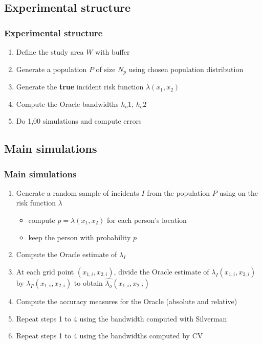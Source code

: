 \documentclass[notheorems]{beamer}
\theoremstyle{definition}
\theoremstyle{example}
\begin{document}
\subsection{Experimental structure}
\begin{frame}\frametitle{Experimental structure}
    \begin{enumerate}
        \item Define the study area $W$ with buffer
        \item Generate a population $P$ of size $N_p$ using chosen population distribution
        \item Generate the \textbf{true} incident risk function $\lambda(x_1, x_2)$
        \item Compute the Oracle bandwidths $h_o1$, $h_o2$
        \item Do 1,00 simulations and compute errors
    \end{enumerate}
\end{frame}

\subsection{Main simulations}
\begin{frame}\frametitle{Main simulations}
    \begin{enumerate}
        \item Generate a random sample of incidents $I$ from the population $P$ using on the risk function $\lambda$
            \begin{itemize}
                \item compute $p = \lambda(x_1,x_2)$ for each person's location
                \item keep the person with probability $p$
            \end{itemize}
        \item Compute the Oracle estimate of $\lambda_I$
        \item At each grid point $(x_{1,i}, x_{2,i})$,
                divide the Oracle estimate of $\lambda_I(x_{1,i}, x_{2,i})$
                by $\lambda_P(x_{1,i}, x_{2,i})$ to obtain $\hat{\lambda_o}(x_{1,i}, x_{2,i})$
        \item Compute the accuracy measures for the Oracle (absolute and relative)
        \item Repeat steps 1 to 4 using the bandwidth computed with Silverman
        \item Repeat steps 1 to 4 using the bandwidths computed by CV
    \end{enumerate}
\end{frame}
\end{document}
